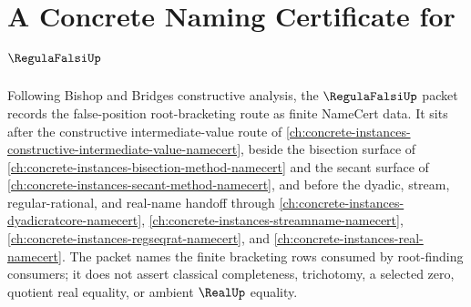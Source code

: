 \chapter{A Concrete Naming Certificate for $\RegulaFalsiUp$}
\label{ch:concrete-instances-regula-falsi-namecert}

Following Bishop and Bridges constructive analysis, the $\RegulaFalsiUp$ packet records the false-position root-bracketing route as finite NameCert data. It sits after the constructive intermediate-value route of \autoref{ch:concrete-instances-constructive-intermediate-value-namecert}, beside the bisection surface of \autoref{ch:concrete-instances-bisection-method-namecert} and the secant surface of \autoref{ch:concrete-instances-secant-method-namecert}, and before the dyadic, stream, regular-rational, and real-name handoff through \autoref{ch:concrete-instances-dyadicratcore-namecert}, \autoref{ch:concrete-instances-streamname-namecert}, \autoref{ch:concrete-instances-regseqrat-namecert}, and \autoref{ch:concrete-instances-real-namecert}. The packet names the finite bracketing rows consumed by root-finding consumers; it does not assert classical completeness, trichotomy, a selected zero, quotient real equality, or ambient $\RealUp$ equality.

